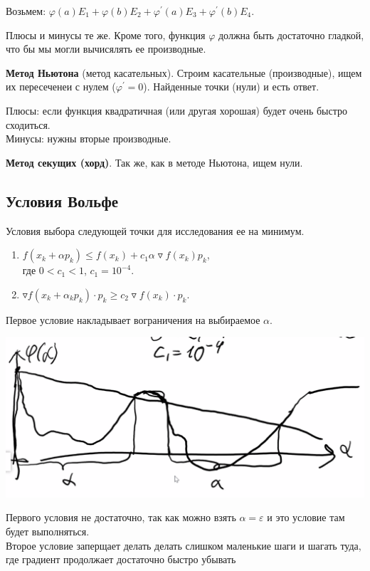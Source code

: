 Возьмем:
$\varphi(a) E_1 + \varphi (b) E_2 + \varphi^\prime (a) E_3 + \varphi^\prime (b) E_4$.

Плюсы и минусы те же.
Кроме того, функция $\varphi$ должна быть достаточно гладкой, что бы мы могли вычисялять ее производные.

\textbf{Метод Ньютона} (метод касательных).
Строим касательные (производные), ищем их пересеченеи с нулем ($\varphi^\prime = 0$).
Найденные точки (нули) и есть ответ.

Плюсы: если функция квадратичная (или другая хорошая) будет очень быстро сходиться.\\
Минусы: нужны вторые производные.

\textbf{Метод секущих (хорд)}.
Так же, как в методе Ньютона, ищем нули.

\subsection{Условия Вольфе}

Условия выбора следующей точки для исследования ее на минимум.

\begin{enumerate}
    \item $f(x_k + \alpha p_k) \leqslant f(x_k) + c_1 \alpha \triangledown f (x_k) p_k$,\\
    где $0 < c_1 < 1$, $c_1 = 10^{-4}$.
    \item $\triangledown f(x_k + \alpha_k p_k) \cdot p_k \geqslant c_2 \triangledown f(x_k) \cdot p_k$.
\end{enumerate}

Первое условие накладывает вограничения на выбираемое $\alpha$.
\begin{center}
    \includegraphics[scale=0.4]{img/methopt_volfe_conditions_1}
\end{center}

Первого условия не достаточно, так как можно взять $\alpha = \varepsilon$ и это условие там будет выполняться. \\
Второе условие заперщает делать делать слишком маленькие шаги и шагать туда, где градиент продолжает достаточно быстро убывать

